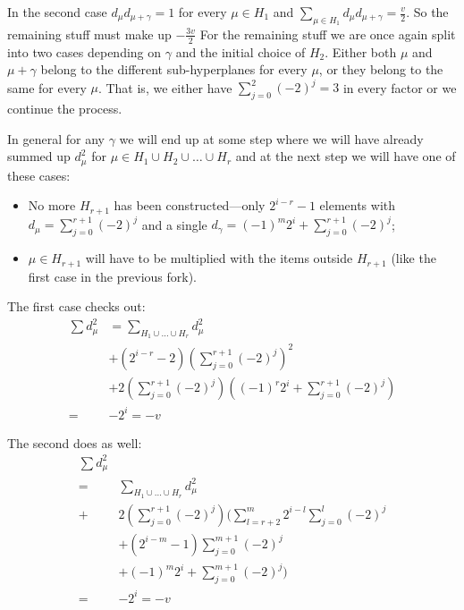         In the second case $d_\mu d_{\mu+\gamma} = 1$ for every $\mu \in H_1$ and $\sum\limits_{\mu \in H_1} d_\mu d_{\mu+\gamma} = \frac v2$. So the remaining stuff must make up $-\frac {3v}2$ For the remaining stuff we are once again split into two cases depending on $\gamma$ and the initial choice of $H_2$. Either both $\mu$ and $\mu+\gamma$ belong to the different sub-hyperplanes for every $\mu$, or they belong to the same for every $\mu$. That is, we either have $\sum\limits_{j=0}^2 (-2)^j = 3$ in every factor or we continue the process.
        
        In general for any $\gamma$ we will end up at some step where we will have already summed up $d_\mu^2$ for $\mu \in H_1 \cup H_2 \cup \ldots \cup H_r$ and at the next step we will have one of these cases:
        
        \begin{itemize}
            \item No more $H_{r+1}$ has been constructed---only $2^{i-r}-1$ elements with $d_\mu = \sum\limits_{j=0}^{r+1} (-2)^j$ and a single $d_\gamma = (-1)^m 2^i + \sum\limits_{j=0}^{r+1} (-2)^j$;
            \item $\mu \in H_{r+1}$ will have to be multiplied with the items outside $H_{r+1}$ (like the first case in the previous fork).
        \end{itemize}

        The first case checks out:
        \begin{equation}
            \begin{split}
                \sum d_\mu^2 & 
                = \sum\limits_{H_1 \cup \ldots \cup H_r} d_\mu^2 \\
                & + (2^{i-r}-2) \left(\sum\limits_{j=0}^{r+1} (-2)^j \right)^2 \\
                & + 2 \left(\sum\limits_{j=0}^{r+1} (-2)^j \right) \left( (-1)^r 2^i + \sum\limits_{j=0}^{r+1} (-2)^j \right) \\
                = & - 2^i = -v
            \end{split}
        \end{equation}
    
        The second does as well:
        \begin{equation}
            \begin{split}
                \sum d_\mu^2 & \\
                = & \sum\limits_{H_1 \cup \ldots \cup H_r} d_\mu^2 \\
                + & 2 \left(\sum\limits_{j=0}^{r+1} (-2)^j \right) 
                 \Bigg(
                    \sum\limits_{l=r+2}^{m} 2^{i-l} \sum\limits_{j=0}^l (-2)^j \\
                   & + (2^{i-m}-1)\sum\limits_{j=0}^{m+1} (-2)^j \\
                   & + (-1)^m 2^i + \sum\limits_{j=0}^{m+1} (-2)^j
                 \Bigg) \\
                = & - 2^i = -v
            \end{split}
        \end{equation}
    
